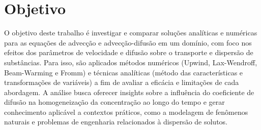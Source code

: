 \section{Objetivo}

O objetivo deste trabalho é investigar e comparar soluções analíticas e numéricas para as equações de advecção e advecção-difusão em um domínio, com foco nos efeitos dos parâmetros de velocidade e difusão sobre o transporte e dispersão de substâncias. Para isso, são aplicados métodos numéricos (Upwind, Lax-Wendroff, Beam-Warming e Fromm) e técnicas analíticas (método das características e transformações de variáveis) a fim de avaliar a eficácia e limitações de cada abordagem. A análise busca oferecer insights sobre a influência do coeficiente de difusão na homogeneização da concentração ao longo do tempo e gerar conhecimento aplicável a contextos práticos, como a modelagem de fenômenos naturais e problemas de engenharia relacionados à dispersão de solutos.
